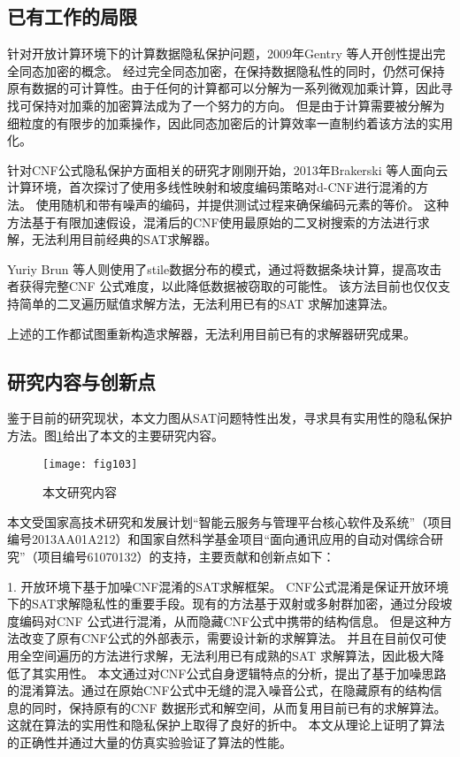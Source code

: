 \subsection{已有工作的局限}
针对开放计算环境下的计算数据隐私保护问题，2009年Gentry 等人开创性提出完全同态加密的概念。
经过完全同态加密，在保持数据隐私性的同时，仍然可保持原有数据的可计算性。由于任何的计算都可以分解为一系列微观加乘计算，因此寻找可保持对加乘的加密算法成为了一个努力的方向。
但是由于计算需要被分解为细粒度的有限步的加乘操作，因此同态加密后的计算效率一直制约着该方法的实用化。

针对CNF公式隐私保护方面相关的研究才刚刚开始，2013年Brakerski 等人面向云计算环境，首次探讨了使用多线性映射和坡度编码策略对d-CNF进行混淆的方法。
使用随机和带有噪声的编码，并提供测试过程来确保编码元素的等价。
这种方法基于有限加速假设，混淆后的CNF使用最原始的二叉树搜索的方法进行求解，无法利用目前经典的SAT求解器。

Yuriy Brun 等人则使用了stile数据分布的模式，通过将数据条块计算，提高攻击者获得完整CNF 公式难度，以此降低数据被窃取的可能性。
该方法目前也仅仅支持简单的二叉遍历赋值求解方法，无法利用已有的SAT 求解加速算法。

上述的工作都试图重新构造求解器，无法利用目前已有的求解器研究成果。

\subsection{研究内容与创新点}
鉴于目前的研究现状，本文力图从SAT问题特性出发，寻求具有实用性的隐私保护方法。图\ref{fig:103}给出了本文的主要研究内容。

\begin{figure}[t] %
  \centering
  \texttt{[image: fig103]}
  \caption{本文研究内容}
  \label{fig:103}
\end{figure}

本文受国家高技术研究和发展计划“智能云服务与管理平台核心软件及系统”（项目编号2013AA01A212）和国家自然科学基金项目“面向通讯应用的自动对偶综合研究”（项目编号61070132）的支持，主要贡献和创新点如下：

1. 开放环境下基于加噪CNF混淆的SAT求解框架。
CNF公式混淆是保证开放环境下的SAT求解隐私性的重要手段。现有的方法基于双射或多射群加密，通过分段坡度编码对CNF 公式进行混淆，从而隐藏CNF公式中携带的结构信息。
但是这种方法改变了原有CNF公式的外部表示，需要设计新的求解算法。
并且在目前仅可使用全空间遍历的方法进行求解，无法利用已有成熟的SAT 求解算法，因此极大降低了其实用性。
本文通过对CNF公式自身逻辑特点的分析，提出了基于加噪思路的混淆算法。通过在原始CNF公式中无缝的混入噪音公式，在隐藏原有的结构信息的同时，保持原有的CNF 数据形式和解空间，从而复用目前已有的求解算法。
这就在算法的实用性和隐私保护上取得了良好的折中。
本文从理论上证明了算法的正确性并通过大量的仿真实验验证了算法的性能。

